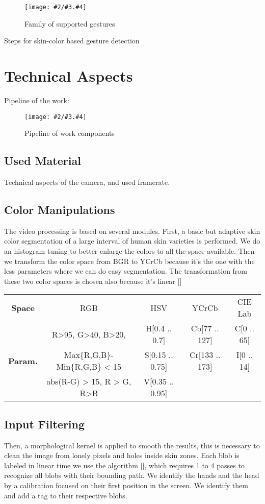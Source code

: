 \documentclass{llncs}
\newcommand\ignore[1]{}
\newcommand{\imagepathext}[5]{%
\begin{figure}[hbtp]
\hfil\texttt{[image: \#2/\#3.\#4]}\hfil
\caption{#5\label{#3}}
\end{figure}}
\newcommand{\png}[2]{\imagepathext{width=\columnwidth}{pics}{#1}{png}{#2}}
\begin{document}
\ignore{
(Get the Study from the report + pics + refs)
}

\png{handg}{Family of supported gestures}

Steps for skin-color based gesture detection

\section{Technical Aspects}
Pipeline of the work:
\png{pipeline}{Pipeline of work components}

\subsection{Used Material}
Technical aspects of the camera, and used framerate.

\ignore{
60 Hz, 640x480
} 

\subsection{Color Manipulations}
The video processing is based on several modules. First, a basic but adaptive skin color segmentation of a large interval of human skin varieties is performed. 
We do an histogram tuning to better enlarge the colors to all the space available.
Then we transform the color space from BGR to YCrCb because it’s the one with the less parameters where we can do easy segmentation. The transformation from these two color spaces is chosen also because it’s linear []

\begin{center}
\begin{tabular}{c|c|c|c|c}
\textbf{Space} & RGB & HSV & YCrCb & CIE Lab\\
  & R>95, G>40, B>20, & H[0.4 .. 0.7] & Cb[77 .. 127] & C[0 .. 65] \\
\textbf{Param.} & Max\{R,G,B\}-Min\{R,G,B\} < 15 & S[0.15 .. 0.75] & Cr[133 .. 173] & I[0 .. 14] \\
  & abs(R-G) > 15, R > G, R>B & V[0.35 .. 0.95] & &
\end{tabular}
\end{center}

\subsection{Input Filtering}
Then, a morphological kernel is applied to smooth the results, this is necessary to clean the image from lonely pixels and holes inside skin zones.
Each blob is labeled in linear time we use the algorithm [], which requires 1 to 4 passes to recognize all blobs with their bounding path.
We identify the hands and the head by a calibration focused on their first position in the screen. We identify them and add a tag to their respective blobs.
\end{document}
